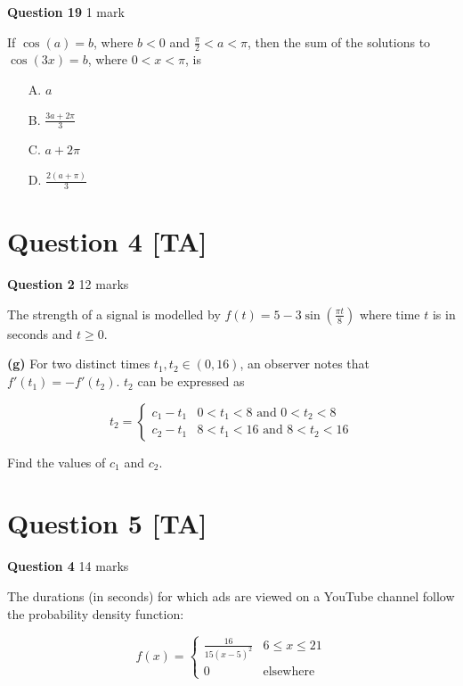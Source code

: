 \documentclass[12pt,a4paper]{article}
\begin{document}
\textbf{Question 19} \hfill 1 mark

If $\cos(a) = b$, where $b < 0$ and $\frac{\pi}{2} < a < \pi$, then the sum of the solutions to $\cos(3x) = b$, where $0 < x < \pi$, is

\begin{enumerate}
    \item[A.] $a$
    \item[B.] $\frac{3a + 2\pi}{3}$
    \item[C.] $a + 2\pi$
    \item[D.] $\frac{2(a + \pi)}{3}$
\end{enumerate}

\vspace{5\baselineskip}

\hrulefill

\section*{Question 4 [TA]}

\textbf{Question 2} \hfill 12 marks

The strength of a signal is modelled by $f(t) = 5 - 3\sin\left(\frac{\pi t}{8}\right)$ where time $t$ is in seconds and $t \geq 0$.

\textbf{(g)} For two distinct times $t_1, t_2 \in (0, 16)$, an observer notes that $f'(t_1) = -f'(t_2)$. $t_2$ can be expressed as

\[
t_2 = \begin{cases}
c_1 - t_1 & 0 < t_1 < 8 \text{ and } 0 < t_2 < 8 \\
c_2 - t_1 & 8 < t_1 < 16 \text{ and } 8 < t_2 < 16
\end{cases}
\]

Find the values of $c_1$ and $c_2$.

\vspace{5\baselineskip}

\hrulefill

\section*{Question 5 [TA]}

\textbf{Question 4} \hfill 14 marks

The durations (in seconds) for which ads are viewed on a YouTube channel follow the probability density function:

\[
f(x) = \begin{cases}
\frac{16}{15(x-5)^2} & 6 \leq x \leq 21 \\
0 & \text{elsewhere}
\end{cases}
\]
\end{document}
